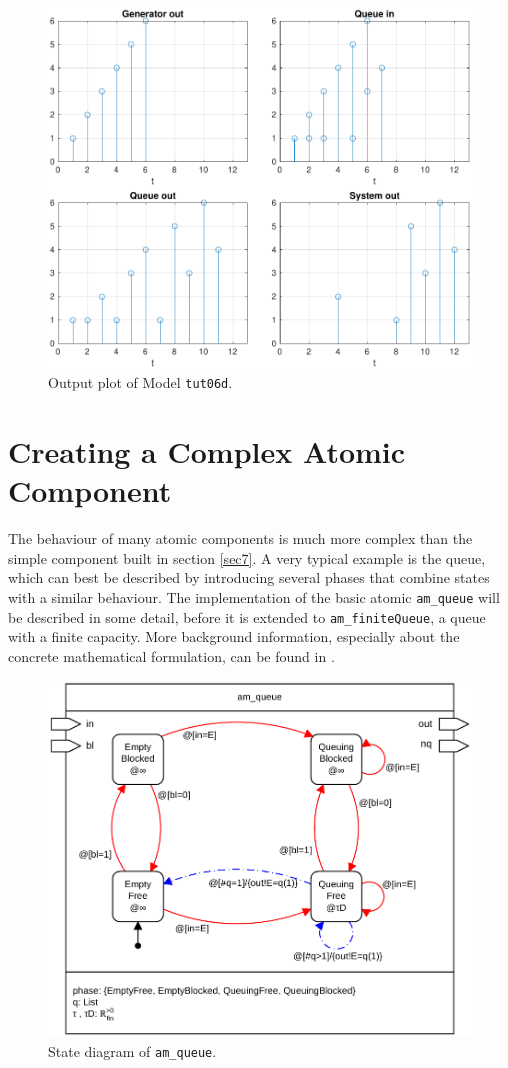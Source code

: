 \documentclass[12pt,oneside,a4paper,bibtotoc,BCOR=0pt,DIV=20]{scrreprt}
\newcommand{\cft}[1]{\mbox{\texttt{#1}}}   %
\begin{document}
\begin{figure}[ht]
\centering
\includegraphics[width=0.48\columnwidth]{images/bild18.pdf}
\caption{Output plot of Model \cft{tut06d}.}
\label{fig_18}
\end{figure}


\chapter{Creating a Complex Atomic Component} \label{sec9}

The behaviour of many atomic components is much more complex than the simple
component built in section \ref{sec7}. A very typical example is the queue,
which can best be described by introducing several phases that combine states
with a similar behaviour. The implementation of the basic atomic
\cft{am\_queue} will be described in some detail, before it is extended to
\cft{am\_finiteQueue}, a queue with a finite capacity. More background
information, especially about the concrete mathematical formulation, can be
found in \cite{nsaExamples}.

\begin{figure}[ht]
\centering
\includegraphics[width=0.76\columnwidth]{images/bild21.pdf}
\caption{State diagram of \cft{am\_queue}.}
\label{fig_21}
\end{figure}
\end{document}
